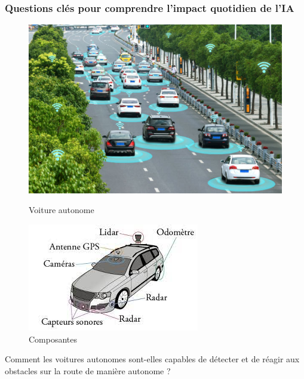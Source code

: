 \documentclass{beamer}
\begin{document}
		
	\begin{frame}
		\frametitle{Questions clés pour comprendre l'impact quotidien de l'IA}
		
		\begin{figure}[h]
			\centering
			\begin{minipage}{0.5\textwidth}
				\centering
				\includegraphics[width=\linewidth]{voiture-autonome.jpg}
				\caption{Voiture autonome}
			\end{minipage}\hfill
			\begin{minipage}{0.5\textwidth}
				\centering
				\includegraphics[width=\linewidth]{voitureauto.jpeg}
				\caption{Composantes }
			\end{minipage}
		\end{figure}
	Comment les voitures autonomes sont-elles capables de détecter et de réagir aux obstacles sur la route de manière autonome ?
		
	\end{frame}	
		
\end{document}

